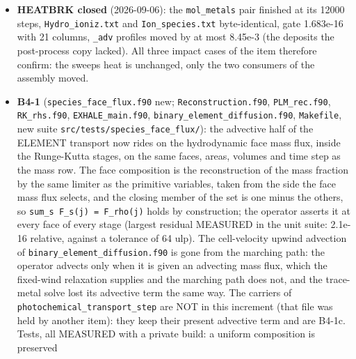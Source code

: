 \documentclass[english,a4paper]{my_memo}
\begin{document}
\begin{itemize}
  reaction to appear), the \texttt{FUV\_bands.txt}/\texttt{Oxygen\_chemistry.txt}
  \texttt{dom\_cells\_HeP} header rewritten, the stale \texttt{n\_co} comment of
  \texttt{ion\_cell\_state.f90} replaced. Private build: \texttt{physics\_probe} 592/0 (incl.
  \texttt{co\_helium\_ion\_sink} 8), \texttt{fuv\_band\_ledger} 24/0. Remaining: the operator
  split is now a LAG (the sweep destroys He+ at the entry CO while the CO row
  destroys CO at the previous sweep\textquotesingle s He+) and \texttt{oxygen\_chemistry} never
  covers a carrier interval in init mode, so this row has no end-to-end
  gate: B4-1c/B5 territory, recorded.
\item
  \textbf{HEATBRK closed} (2026-09-06): the \texttt{mol\_metals} pair finished at its
  12000 steps, \texttt{Hydro\_ioniz.txt} and \texttt{Ion\_species.txt} byte-identical, gate
  1.683e-16 with 21 columns, \texttt{\_adv} profiles moved by at most 8.45e-3 (the
  deposits the post-process copy lacked). All three impact cases of the item
  therefore confirm: the sweep\textquotesingle s heat is unchanged, only the two consumers
  of the assembly moved.
\item
  \textbf{B4-1} (\texttt{species\_face\_flux.f90} new; \texttt{Reconstruction.f90}, \texttt{PLM\_rec.f90},
  \texttt{RK\_rhs.f90}, \texttt{EXHALE\_main.f90}, \texttt{binary\_element\_diffusion.f90}, \texttt{Makefile},
  new suite \texttt{src/tests/species\_face\_flux/}): the advective half of the ELEMENT
  transport now rides on the hydrodynamic face mass flux, inside the
  Runge-Kutta stages, on the same faces, areas, volumes and time step as the
  mass row. The face composition is the reconstruction of the mass fraction by
  the same limiter as the primitive variables, taken from the side the face
  mass flux selects, and the closing member of the set is one minus the
  others, so \texttt{sum\_s\ F\_s(j)\ =\ F\_rho(j)} holds by construction; the operator
  asserts it at every face of every stage (largest residual MEASURED in the
  unit suite: 2.1e-16 relative, against a tolerance of 64 ulp). The
  cell-velocity upwind advection of \texttt{binary\_element\_diffusion.f90} is gone
  from the marching path: the operator advects only when it is given an
  advecting mass flux, which the fixed-wind relaxation supplies and the
  marching path does not, and the trace-metal solve lost its advective term
  the same way. The carriers of \texttt{photochemical\_transport\_step} are NOT in this
  increment (that file was held by another item): they keep their present
  advective term and are B4-1c.
  Tests, all MEASURED with a private build: a uniform composition is preserved

\end{itemize}
\end{document}
